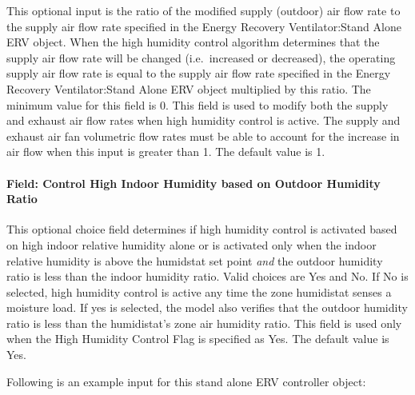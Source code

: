 This optional input is the ratio of the modified supply (outdoor) air flow rate to the supply air flow rate specified in the Energy Recovery Ventilator:Stand Alone ERV object. When the high humidity control algorithm determines that the supply air flow rate will be changed (i.e.~increased or decreased), the operating supply air flow rate is equal to the supply air flow rate specified in the Energy Recovery Ventilator:Stand Alone ERV object multiplied by this ratio. The minimum value for this field is 0. This field is used to modify both the supply and exhaust air flow rates when high humidity control is active. The supply and exhaust air fan volumetric flow rates must be able to account for the increase in air flow when this input is greater than 1. The default value is 1.

\paragraph{Field: Control High Indoor Humidity based on Outdoor Humidity Ratio}\label{field-control-high-indoor-humidity-based-on-outdoor-humidity-ratio-1}

This optional choice field determines if high humidity control is activated based on high indoor relative humidity alone or is activated only when the indoor relative humidity is above the humidstat set point \emph{and} the outdoor humidity ratio is less than the indoor humidity ratio. Valid choices are Yes and No. If No is selected, high humidity control is active any time the zone humidistat senses a moisture load. If yes is selected, the model also verifies that the outdoor humidity ratio is less than the humidistat's zone air humidity ratio. This field is used only when the High Humidity Control Flag is specified as Yes. The default value is Yes.

Following is an example input for this stand alone ERV controller object:

